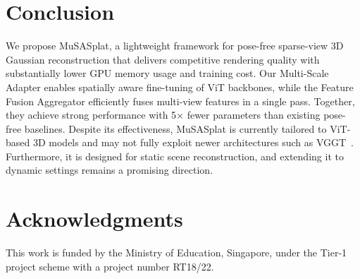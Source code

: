 \documentclass[letterpaper]{article} %
\begin{document}
\section{Conclusion}
\label{sec:conclusion}
We propose MuSASplat, a lightweight framework for pose-free sparse-view 3D Gaussian reconstruction that delivers competitive rendering quality with substantially lower GPU memory usage and training cost. Our Multi-Scale Adapter enables spatially aware fine-tuning of ViT backbones, while the Feature Fusion Aggregator efficiently fuses multi-view features in a single pass. Together, they achieve strong performance with 5× fewer parameters than existing pose-free baselines.
Despite its effectiveness, MuSASplat is currently tailored to ViT-based 3D models and may not fully exploit newer architectures such as VGGT~\cite{wang2025vggt}. Furthermore, it is designed for static scene reconstruction, and extending it to dynamic settings remains a promising direction.



\section{Acknowledgments}
This work is funded by the Ministry of Education, Singapore, under the Tier-1 project scheme with a project number RT18/22.



\end{document}
